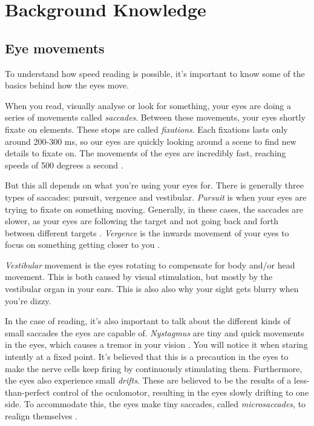 \section{Background Knowledge}

\subsection{Eye movements}
To understand how speed reading is possible, it's important to know some of the basics behind how the eyes move.

When you read, visually analyse or look for something, your eyes are doing a series of movements called \textit{saccades}. Between these movements, your eyes shortly fixate on elements. These stops are called \textit{fixations}. Each fixations lasts only around 200-300 ms, so our eyes are quickly looking around a scene to find new details to fixate on. The movements of the eyes  are incredibly fast, reaching speeds of 500 degrees a second \cite{eyeMovement}.

But this all depends on what you're using your eyes for. There is generally three types of saccades: pursuit, vergence and vestibular. \textit{Pursuit} is when your eyes are trying to fixate on something moving. Generally, in these cases, the saccades are slower, as your eyes are following the target and not going back and forth between different targets \cite{eyeMovement}.
\textit{Vergence} is the inwards movement of your eyes to focus on something getting closer to you \cite{eyeMovement}.

\textit{Vestibular} movement is the eyes rotating to compensate for body and/or head movement. This is both caused by visual stimulation, but mostly by the vestibular organ in your ears. This is also also why your sight gets blurry when you're dizzy.

In the case of reading, it's also important to talk about the different kinds of small saccades the eyes are capable of. \textit{Nystagmus} are tiny and quick movements in the eyes, which causes a tremor in your vision \cite{eyeMovement}. You will notice it when staring intently at a fixed point. It's believed that this is a precaution in the eyes to make the nerve cells keep firing by continuously stimulating them. Furthermore, the eyes also experience small \textit{drifts}. These are believed to be the results of a less-than-perfect control of the oculomotor, resulting in the eyes slowly drifting to one side. To accommodate this, the eyes make tiny saccades, called \textit{microsaccades}, to realign themselves \cite{eyeMovement}. 

